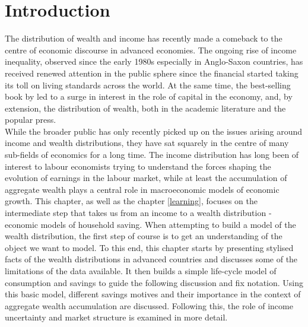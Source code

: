 \section{Introduction}

The distribution of wealth and income has recently made a comeback to the
centre of economic discourse in advanced economies. The ongoing rise of
income inequality, observed since the early 1980s especially in Anglo-Saxon
countries, has received renewed attention in the public sphere since the
financial started taking its toll on living standards across the world. At
the same time, the best-selling book by \citet{Piketty2014} led to a surge
in interest in the role of capital in the economy, and, by extension, the
distribution of wealth, both in the academic literature and the popular
press. \\
While the broader public has only recently picked up on the issues arising
around income and wealth distributions, they have sat squarely in the centre
of many sub-fields of economics for a long time. The income distribution has
long been of interest to labour economists trying to understand the forces
shaping the evolution of earnings in the labour market, while at least the
accumulation of aggregate wealth plays a central role in macroeconomic
models of economic growth. This chapter, as well as the chapter
\ref{learning}, focuses on the intermediate step that takes us from an
income to a wealth distribution - economic models of household saving.
When attempting to build a model of the wealth distribution, the first
step of course is to get an understanding of the object we want to model.
To this end, this chapter starts by presenting stylised facts of the wealth
distributions in advanced countries and discusses some of the limitations
of the data available. It then builds a simple life-cycle model of consumption
and savings to guide the following discussion and fix notation. Using this
basic model, different savings motives and their importance in the context
of aggregate wealth accumulation are discussed. Following this, the role of
income uncertainty and market structure is examined in more detail.



